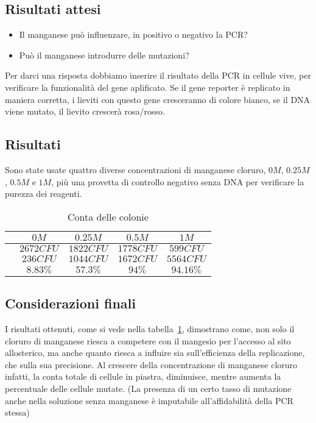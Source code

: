 	\subsection*{Risultati attesi}
	\begin{itemize}
        	\item Il manganese può influenzare, in positivo o negativo la PCR?
       		\item Può il manganese introdurre delle mutazioni?
	\end{itemize}
	Per darci una risposta dobbiamo inserire il risultato della PCR in cellule vive, per verificare la funzionalità del gene aplificato.
        Se il gene reporter è replicato in maniera corretta, i lieviti con questo gene cresceranno di colore bianco, se il DNA viene mutato, il lievito crescerà rosa/rosso.

   	\subsection*{Risultati}
        Sono state usate quattro diverse concentrazioni di manganese cloruro, $0M$, $0.25M$, $0.5M$ e $1M$, più una provetta di controllo negativo senza DNA per verificare la
        purezza dei reagenti.
	\begin{table}[H]
		\centering
		\begin{tabular}{|c|c|c|c|c|}
			\hline
			\makecell{Concentrazione di \emph{$MnCl_2$}} & $0M$ & $0.25M$ & $0.5M$ & $1M$\\
			\hline
			\makecell{Conta totale} & $2672CFU$ & $1822CFU$ & $1778CFU$ & $599CFU$ \\
			\hline
			\makecell{Colonie mutate} & $236CFU$ & $1044CFU$ & $1672CFU$ & $5564CFU$\\
			\hline
			\makecell{Tasso di mutazione} & $8.83\%$ & $57.3\%$ & $94\%$ & $94.16\%$\\
			\hline
		\end{tabular}
		\caption{Conta delle colonie}
		\label{tab}
	\end{table}


	\subsection*{Considerazioni finali}
	I risultati ottenuti, come si vede nella tabella~\ref{tab}, dimostrano come, non solo il cloruro di manganese riesca a competere con il mangesio per l'accesso al sito allosterico,
        ma anche quanto riesca a influire sia sull'efficienza della replicazione, che sulla sua precisione.
        Al crescere della concentrazione di manganese cloruro infatti, la conta totale di cellule in piastra, diminuisce, mentre aumenta la percentuale delle cellule mutate.
        (La presenza di un certo tasso di mutazione anche nella soluzione senza manganese è imputabile all'affidabilità della PCR stessa)

